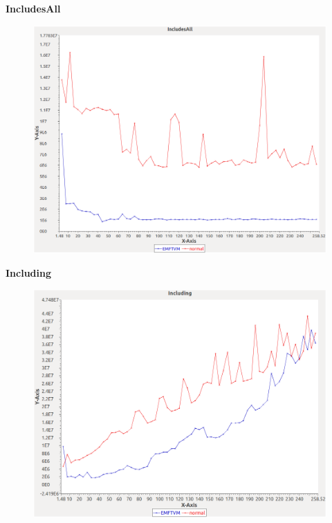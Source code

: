 \noindent\textbf{IncludesAll}

\begin{figure}[h]
\centering
\includegraphics[width=\textwidth]{../graphs/bag/IncludesAll}
\end{figure}
\pagebreak

\noindent\textbf{Including}

\begin{figure}[h]
\centering
\includegraphics[width=\textwidth]{../graphs/bag/Including}
\end{figure}
\pagebreak

